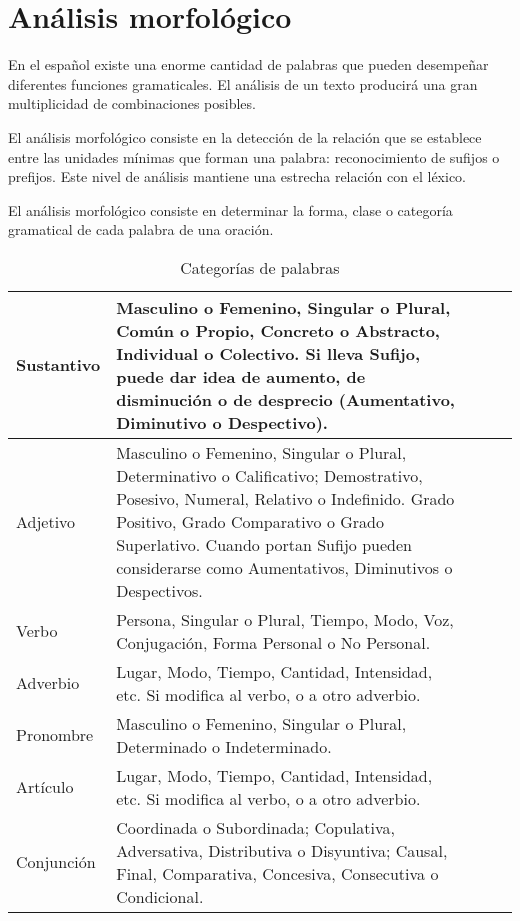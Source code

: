 \section{An\'alisis morfol\'ogico}

En el espa\~nol existe una enorme cantidad de palabras que pueden desempe\~nar diferentes funciones gramaticales. El an\'alisis de un texto producir\'a una gran multiplicidad de combinaciones posibles.

El an\'alisis morfol\'ogico consiste en la detecci\'on de la relaci\'on que se establece entre las unidades m\'inimas que forman una palabra: reconocimiento de sufijos o prefijos. Este nivel de an\'alisis  mantiene una estrecha relaci\'on con el l\'exico. \cite{elprofesionaldelainformacion}

El an\'alisis morfol\'ogico consiste en determinar la forma, clase o categor\'ia gramatical de cada palabra de una oraci\'on. \cite{morfo}

\begin{center}

\begin{table}[h]

\begin{tabular}{|l|p{75mm}|l|l|p{50mm}|}

\hline

Sustantivo &  Masculino o Femenino, Singular o Plural, Com\'un o Propio, Concreto o Abstracto, Individual o Colectivo. Si lleva Sufijo, puede dar idea de aumento, de disminuci\'on o de desprecio (Aumentativo, Diminutivo o Despectivo). \\
\hline

Adjetivo & Masculino o Femenino, Singular o Plural, Determinativo o Calificativo; Demostrativo, Posesivo, Numeral, Relativo o Indefinido. Grado Positivo, Grado Comparativo o Grado Superlativo. Cuando portan Sufijo pueden considerarse como Aumentativos, Diminutivos o Despectivos.\\
\hline
Verbo & Persona, Singular o Plural, Tiempo, Modo, Voz, Conjugaci\'on, Forma Personal o No Personal. \\
\hline
Adverbio & Lugar, Modo, Tiempo, Cantidad, Intensidad, etc. Si modifica al verbo, o a otro adverbio. \\
\hline
Pronombre & Masculino o Femenino, Singular o Plural, Determinado o Indeterminado.\\
\hline
Art\'iculo & Lugar, Modo, Tiempo, Cantidad, Intensidad, etc. Si modifica al verbo, o a otro adverbio. \\
\hline
Conjunci\'on & Coordinada o Subordinada; Copulativa, Adversativa, Distributiva o Disyuntiva; Causal, Final, Comparativa, Concesiva, Consecutiva o Condicional.\\
\hline

\end{tabular}
\label{table:tabla1}
\caption{Categor\'ias de palabras}
\end{table}
\end{center}